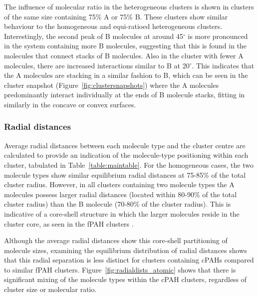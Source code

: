 The influence of molecular ratio in the heterogeneous clusters is shown in clusters of the same size containing 75\% A or 75\% B. These clusters show similar behaviour to the homogeneous and equi-ratioed heterogeneous clusters.  Interestingly, the second peak of B molecules at around 45$^{\circ}$ is more pronounced in the system containing more B molecules, suggesting that this is found in the molecules that connect stacks of B molecules.  Also in the cluster with fewer A molecules, there are increased interactions similar to B at 20$^{\circ}$. This indicates that the A molecules are stacking in a similar fashion to B, which can be seen in the cluster snapshot (Figure~\ref{fig:clustersnapshots}) where the A molecules predominantly interact individually at the ends of B molecule stacks, fitting in similarly in the concave or convex surfaces.

\subsubsection{Radial distances}
Average radial distances between each molecule type and the cluster centre are calculated to provide an indication of the molecule-type positioning within each cluster, tabulated in  Table~\ref{table:maintable}. For the homogeneous cases, the two molecule types show similar equilibrium radial distances at 75-85\% of the total cluster radius. However, in all clusters containing two molecule types the A molecules possess larger radial distances (located within 80-90\% of the total cluster radius) than the B molecule (70-80\% of the cluster radius). This is indicative of a core-shell structure in which the larger molecules reside in the cluster core, as seen in the fPAH clusters \cite{bowal2018partitioning}.

Although the average radial distances show this core-shell partitioning of molecule sizes, examining the equilibrium distribution of radial distances shows that this radial separation is less distinct for clusters containing cPAHs compared to similar fPAH clusters. Figure~\ref{fig:radialdists_atomic} shows that there is significant mixing of the molecule types within the cPAH clusters, regardless of cluster size or molecular ratio.

